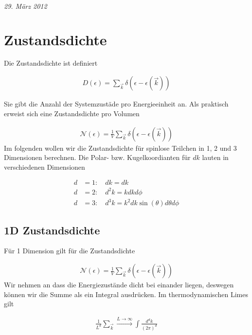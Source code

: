 
\usepackage{amsmath} 





\textit{29. März 2012}


\section*{Zustandsdichte}

Die Zustandsdichte ist definiert 

\begin{align}
  \label{eq:1}
  \boxed{ D(\epsilon) = \sum_{\vec k} \delta(\epsilon - \epsilon(\vec k)) }
\end{align}

Sie gibt die Anzahl der Systemzustäde pro Energieeinheit an. Als praktisch erweist sich eine Zustandsdichte pro Volumen

\begin{align}
  \label{eq:2}
  \mathcal N(\epsilon) = \frac{1}{V} \sum_{\vec k} \delta(\epsilon - \epsilon(\vec k))
\end{align}
Im folgenden wollen wir die Zustandsdichte für spinlose Teilchen in 1, 2 und 3 Dimensionen berechnen. Die Polar- bzw. Kugelkoordianten für \(dk\) lauten in verschiedenen Dimensionen

\begin{align}
  d&=1:\quad dk = dk \label{eq:10.1} \\
  d&=2:\quad d^2k = kdkd\phi \label{eq:10.2}\\
  d&=3:\quad d^3k = k^2dk \sin(\theta)d\theta d\phi \label{eq:10.3}
\end{align}

\subsection*{1D Zustandsdichte}

Für 1 Dimension gilt für die Zustandsdichte

\begin{align}
  \label{eq:3}
  \mathcal N(\epsilon) = \frac{1}{V} \sum_{\vec k} \delta(\epsilon - \epsilon(\vec k))
\end{align}
Wir nehmen an dass die Energiezustände dicht bei einander liegen, deswegen können wir die Summe als ein Integral ausdrücken. Im thermodynamischen Limes gilt

\begin{align}
  \label{eq:4}
\boxed{  \frac{1}{L^d}\sum_{\vec k} \xrightarrow{L\to \infty} \int \frac{d^d k}{(2\pi)^d} }
\end{align}


